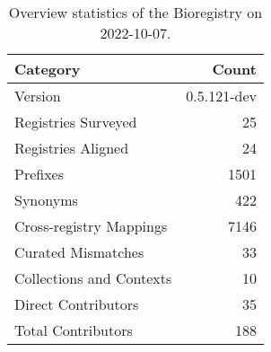 \begin{table}
\centering
\caption{Overview statistics of the Bioregistry on 2022-10-07.}
\label{tab:bioregistry-summary}
\begin{tabular}{lr}
\toprule
                Category &       Count \\
\midrule
                 Version & 0.5.121-dev \\
     Registries Surveyed &          25 \\
      Registries Aligned &          24 \\
                Prefixes &        1501 \\
                Synonyms &         422 \\
 Cross-registry Mappings &        7146 \\
      Curated Mismatches &          33 \\
Collections and Contexts &          10 \\
     Direct Contributors &          35 \\
      Total Contributors &         188 \\
\bottomrule
\end{tabular}
\end{table}
